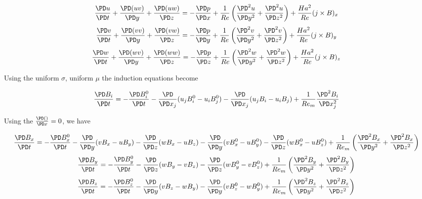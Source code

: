 \documentclass[11pt]{article}
\begin{document}
\begin{equation}
	\frac{\PD u}{\PD t}
	+ \frac{\PD (u v)}{\PD y}
	+ \frac{\PD (u w)}{\PD z}
	=
	- \frac{\PD p}{\PD x}
	+ \frac{1}{Re}
	\left(
	\frac{\PD^2 u}{\PD y^2}
	+\frac{\PD^2 u}{\PD z^2}
	\right)
	+ \frac{Ha^2}{Re}
	(j \times B)_x
\end{equation}
\begin{equation}
	\frac{\PD v}{\PD t}
	+ \frac{\PD (v v)}{\PD y}
	+ \frac{\PD (v w)}{\PD z}
	=
	- \frac{\PD p}{\PD y}
	+ \frac{1}{Re}
	\left(
	\frac{\PD^2 v}{\PD y^2}
	+\frac{\PD^2 v}{\PD z^2}
	\right)
	+ \frac{Ha^2}{Re}
	(j \times B)_y
\end{equation}
\begin{equation}
	\frac{\PD w}{\PD t}
	+ \frac{\PD (w v)}{\PD y}
	+ \frac{\PD (w w)}{\PD z}
	=
	- \frac{\PD p}{\PD z}
	+ \frac{1}{Re}
	\left(
	\frac{\PD^2 w}{\PD y^2}
	+\frac{\PD^2 w}{\PD z^2}
	\right)
	+ \frac{Ha^2}{Re}
	(j \times B)_z
\end{equation}

Using the uniform $\sigma$, uniform $\mu$ the induction equations become

\begin{equation}
	\frac{\PD B_i}{\PD t}
	=
	- \frac{\PD B_i^0}{\PD t}
	- \frac{\PD}{\PD x_j} (u_j B_i^0 - u_i B_j^0)
	- \frac{\PD}{\PD x_j} (u_j B_i - u_i B_j)
	+
	\frac{1}{Re_m}
	\frac{\PD^2 B_i}{\PD x_j^2}
\end{equation}

Using the $\frac{\PD ()}{\PD x} = 0$, we have

\begin{equation}
	\frac{\PD B_x}{\PD t}
	=
	- \frac{\PD B_x^0}{\PD t}
	- \frac{\PD}{\PD y} (v B_x - u B_y)
	- \frac{\PD}{\PD z} (w B_x - u B_z)
	- \frac{\PD}{\PD y} (v B_x^0 - u B_y^0)
	- \frac{\PD}{\PD z} (w B_x^0 - u B_z^0)
	+
	\frac{1}{Re_m}
	\left(
	\frac{\PD^2 B_x}{\PD y^2}
	+ \frac{\PD^2 B_x}{\PD z^2}
	\right)
\end{equation}
\begin{equation}
	\frac{\PD B_y}{\PD t}
	=
	- \frac{\PD B_y^0}{\PD t}
	- \frac{\PD}{\PD z} (w B_y - v B_z)
	- \frac{\PD}{\PD z} (w B_y^0 - v B_z^0)
	+
	\frac{1}{Re_m}
	\left(
	\frac{\PD^2 B_y}{\PD y^2}
	+ \frac{\PD^2 B_y}{\PD z^2}
	\right)
\end{equation}
\begin{equation}
	\frac{\PD B_z}{\PD t}
	=
	- \frac{\PD B_z^0}{\PD t}
	- \frac{\PD}{\PD y} (v B_z - w B_y)
	- \frac{\PD}{\PD y} (v B_z^0 - w B_y^0)
	+
	\frac{1}{Re_m}
	\left(
	\frac{\PD^2 B_z}{\PD y^2}
	+ \frac{\PD^2 B_z}{\PD z^2}
	\right)
\end{equation}
\end{document}
